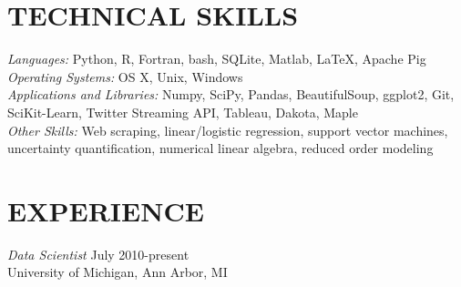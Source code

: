 \documentclass[margin, 10pt]{res} %
\begin{document}
\begin{resume}


\section{TECHNICAL SKILLS} 

{\sl Languages:} Python, R, Fortran, bash, SQLite, Matlab, \LaTeX, Apache Pig \\
{\sl Operating Systems:} OS X, Unix, Windows \\
{\sl Applications and Libraries:} Numpy, SciPy, Pandas, BeautifulSoup, ggplot2, Git, SciKit-Learn, Twitter Streaming API, Tableau, Dakota, Maple  \\
{\sl Other Skills:} Web scraping, linear/logistic regression, support vector machines, uncertainty quantification, numerical linear algebra, reduced order modeling

 
\section{EXPERIENCE}

{\sl Data Scientist} \hfill July 2010-present \\
University of Michigan, Ann Arbor, MI


\end{resume}
\end{document}
